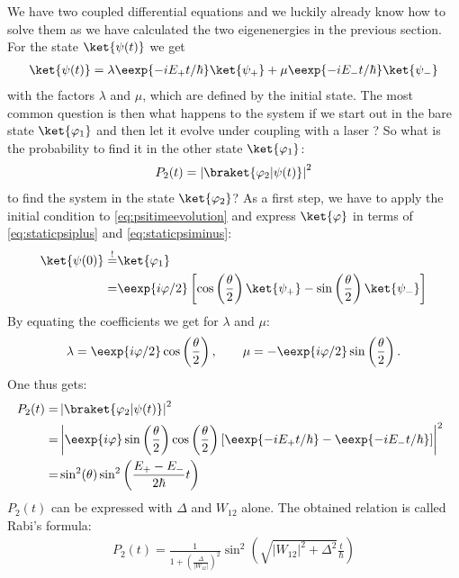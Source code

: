 We have two coupled differential equations and we luckily already know how to solve them as we have calculated the two eigenenergies in the previous section. For the state $\ket{\psi(t)}$ we get
\begin{align}
 \ket{\psi(t)}=\lambda \eexp{-i{E_+}t/{\hbar}} \ket{\psi_+} + \mu \eexp{-i{E_-}t/{\hbar}} \ket{\psi_-} \label{eq:psitimeevolution}
\end{align}
with the factors $\lambda$ and $\mu$, which are defined by the initial state. The most common question is then what happens to the system if we start out in the bare state $\ket{\varphi_1}$ and then let it evolve under coupling with a laser ? So what is the probability to find it in the other state $\ket{\varphi_1}$:
	\begin{align}
					P_2(t)=\left|\braket{\varphi_2|\psi(t)}\right|^2
				\end{align}
				to find the system in the state $\ket{\varphi_2}$? As a first step, we have to apply the initial condition to \eqref{eq:psitimeevolution} and express $\ket{\varphi}$ in terms of \eqref{eq:staticpsiplus} and \eqref{eq:staticpsiminus}:
				\begin{align}
					\ket{\psi(0)} \overset{!}{=}& \ket{\varphi_1}\\
											  = & \eexp{i{\varphi}/{2}} \left[ \cos\left( \frac{\theta}{2}\right) \ket{\psi_+}-\sin\left(\frac{\theta}{2}\right)\ket{\psi_-}\right]
				\end{align}
				By equating the coefficients we get for $\lambda$ and $\mu$:
				\begin{align}
					\lambda = \eexp{i{\varphi}/{2}}\cos\left(\frac{\theta}{2}\right), \qquad  \mu = -\eexp{i{\varphi}/{2}}\sin\left(\frac{\theta}{2}\right).
				\end{align}
				One thus gets:
				\begin{align}
					\hspace{-2mm} P_2(t)	=&\left|\braket{\varphi_2|\psi(t)}\right|^2 \\
											=& \left|\eexp{i\varphi} \sin\left(\frac{\theta}{2}\right)\cos\left(\frac{\theta}{2}\right)\left[\eexp{-i{E_+}t/{\hbar}} - \eexp{-i{E_-}t/{\hbar}}\right]\right|^2\\
											=& \sin^2(\theta)\sin^2\left(\frac{E_+-E_-}{2\hbar}t\right)
				\end{align}
$P_2(t)$ can be expressed with $\Delta$ and $W_{12}$ alone. The obtained relation is called Rabi's formula:
\begin{align}
 P_2(t)=\frac{1}{1+\left(\frac{\Delta}{|W_{12}|}\right)^2}\sin^2\left(\sqrt{|W_{12}|^2+\Delta^2}\frac{t}{\hbar}\right)
\end{align}